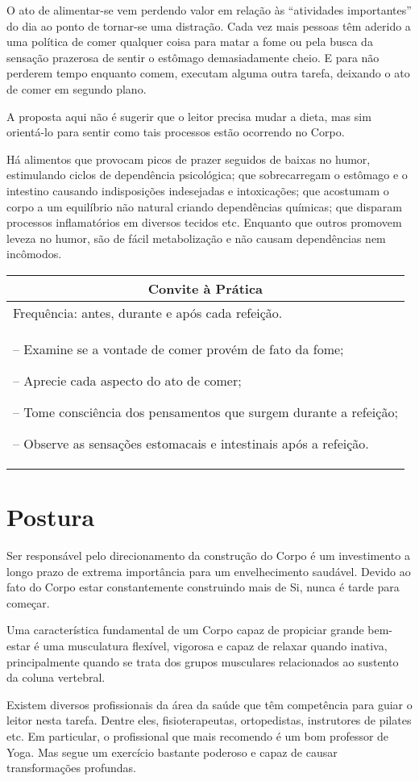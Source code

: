 \documentclass[oneside, 12pt]{book}
\newenvironment{prat}[1]
{\begin{center}
\begin{tabular}{p{0.9\textwidth}}
\hline\hline
\multicolumn{1}{c}{Convite à Prática}\\
\hline
Frequência: #1.\\
\hline
}{\\
\hline\hline
\end{tabular} 
\end{center}}
\begin{document}
O ato de alimentar-se vem perdendo valor em relação às ``atividades importantes'' do dia ao ponto de tornar-se uma distração. Cada vez mais pessoas têm aderido a uma política de comer qualquer coisa para matar a fome ou pela busca da sensação prazerosa de sentir o estômago demasiadamente cheio. E para não perderem tempo enquanto comem, executam alguma outra tarefa, deixando o ato de comer em segundo plano.

A proposta aqui não é sugerir que o leitor precisa mudar a dieta, mas sim orientá-lo para sentir como tais processos estão ocorrendo no Corpo.

Há alimentos que provocam picos de prazer seguidos de baixas no humor, estimulando ciclos de dependência psicológica; que sobrecarregam o estômago e o intestino causando indisposições indesejadas e intoxicações; que acostumam o corpo a um equilíbrio não natural criando dependências químicas; que disparam processos inflamatórios em diversos tecidos etc. Enquanto que outros promovem leveza no humor, são de fácil metabolização e não causam dependências nem incômodos.

\begin{prat}{antes, durante e após cada refeição}
-- Examine se a vontade de comer provém de fato da fome;

-- Aprecie cada aspecto do ato de comer;

-- Tome consciência dos pensamentos que surgem durante a refeição;

-- Observe as sensações estomacais e intestinais após a refeição.
\end{prat}

\section*{Postura}

Ser responsável pelo direcionamento da construção do Corpo é um investimento a longo prazo de extrema importância para um envelhecimento saudável. Devido ao fato do Corpo estar constantemente construindo mais de Si, nunca é tarde para começar.

Uma característica fundamental de um Corpo capaz de propiciar grande bem-estar é uma musculatura flexível, vigorosa e capaz de relaxar quando inativa, principalmente quando se trata dos grupos musculares relacionados ao sustento da coluna vertebral.

Existem diversos profissionais da área da saúde que têm competência para guiar o leitor nesta tarefa. Dentre eles, fisioterapeutas, ortopedistas, instrutores de pilates etc. Em particular, o profissional que mais recomendo é um bom professor de Yoga. Mas segue um exercício bastante poderoso e capaz de causar transformações profundas.
\end{document}
